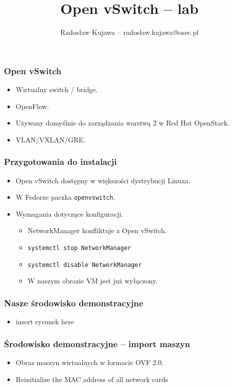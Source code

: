 \documentclass[dvipsnames,table]{beamer}
\title{Open vSwitch -- lab}
\author{Radosław Kujawa -- radoslaw.kujawa@osec.pl}
\institute{OSEC}
\begin{document}
\begin{frame}
	\titlepage
\end{frame}

\begin{frame}
\frametitle{Open vSwitch}
\begin{itemize}
	\item Wirtualny switch / bridge.
	\item OpenFlow.
	\item Używany domyślnie do zarządzania warstwą 2 w Red Hat OpenStack.
	\item VLAN/VXLAN/GRE.
\end{itemize}
\end{frame}

\begin{frame}
\frametitle{Przygotowania do instalacji}
\begin{itemize}
	\item Open vSwitch dostępny w większości dystrybucji Linuxa.
	\item W Fedorze paczka {\tt openvswitch}.
	\item Wymagania dotyczące konfiguracji.
	\begin{itemize}
		\item NetworkManager konfliktuje z Open vSwitch.
		\item {\tt systemctl stop NetworkManager}
		\item {\tt systemctl disable NetworkManager}
		\item W naszym obrazie VM jest już wyłączony.
	\end{itemize}
\end{itemize}
\end{frame}

\begin{frame}
\frametitle{Nasze środowisko demonstracyjne}
\begin{itemize}
	\item insert rysunek here 
\end{itemize}
\end{frame}

\begin{frame}
\frametitle{Środowisko demonstracyjne -- import maszyn}
\begin{itemize}
	\item Obraz maszyn wirtualnych w formacie OVF 2.0.
	\item Reinitialize the MAC address of all network cards 
\end{itemize}
\end{frame}
\end{document}
